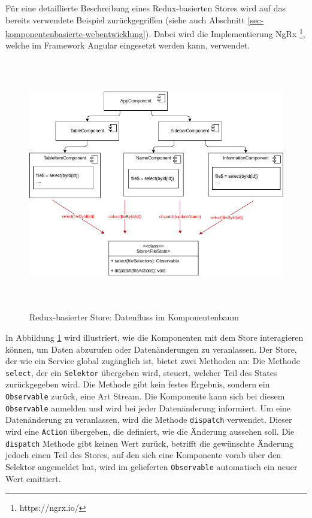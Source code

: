 \documentclass[12pt]{book}          %
\begin{document}
Für eine detaillierte Beschreibung eines Redux-basierten Stores wird auf das bereits verwendete Beispiel zurückgegriffen (siehe auch Abschnitt \ref{sec-komponentenbasierte-webentwicklung}). Dabei wird die Implementierung NgRx \footnote{https://ngrx.io/}, welche im Framework Angular eingesetzt werden kann, verwendet.

\begin{figure}[htbp]
\centering
\includegraphics[height=11cm]{abbildungen/easy-state.png}
\caption{Redux-basierter Store: Datenfluss im Komponentenbaum}
\label{redux-easy-state}
\end{figure}

In Abbildung \ref{redux-easy-state} wird illustriert, wie die Komponenten mit dem Store interagieren können, um Daten abzurufen oder Datenänderungen zu veranlassen. Der Store, der wie ein Service global zugänglich ist, bietet zwei Methoden an: Die Methode \texttt{select}, der ein \texttt{Selektor} übergeben wird, steuert, welcher Teil des States zurückgegeben wird. Die Methode gibt kein festes Ergebnis, sondern ein \texttt{Observable} zurück, eine Art Stream. Die Komponente kann sich bei diesem \texttt{Observable} anmelden und wird bei jeder Datenänderung informiert. Um eine Datenänderung zu veranlassen, wird die Methode \texttt{dispatch} verwendet. Dieser wird eine \texttt{Action} übergeben, die definiert, wie die Änderung aussehen soll. Die \texttt{dispatch} Methode gibt keinen Wert zurück, betrifft die gewünschte Änderung jedoch einen Teil des Stores, auf den sich eine Komponente vorab über den Selektor angemeldet hat, wird im gelieferten \texttt{Observable} automatisch ein neuer Wert emittiert.
\end{document}
